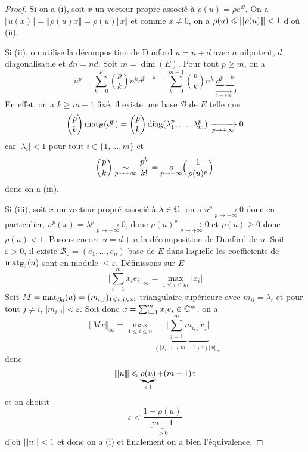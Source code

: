 \documentclass[12pt]{article}
\begin{document}
\begin{proof}
	Si on a (i), soit $x$ un vecteur propre associé à $\rho(u)=\rho e^{\mathrm{i}\theta}$. On a $\Vert u(x)\Vert=\Vert\rho(u) x\Vert=\rho(u)\Vert x\Vert$ et comme $x\neq0$, on a $\rho(u)\leqslant{\left\vert\kern-0.25ex\left\vert\kern-0.25ex\left\vert{}\rho(u) \right\vert\kern-0.25ex\right\vert\kern-0.25ex\right\vert}<1$ d'où (ii).

	Si (ii), on utilise la décomposition de Dunford $u=n+d$ avec $n$ nilpotent, $d$ diagonalisable et $dn=nd$. Soit $m=\dim(E)$. Pour tout $p\geqslant m$, on a 
	\begin{equation}u^{p}=\sum_{k=0}^{p}\binom{p}{k}n^{k}d^{p-k}=\sum_{k=0}^{m-1}\binom{p}{k}n^{k}\underbrace{d^{p-k}}_{\xrightarrow[p\to+\infty]{}0}\end{equation}
	En effet, on a $k\geqslant m-1$ fixé, il existe une base $\mathcal{B}$ de $E$ telle que 
	\begin{equation}\binom{p}{k}\operatorname{mat}\limits_{\mathcal{B}}(d^{p})=\binom{p}{k}\operatorname{diag}(\lambda_{1}^{p},\dots,\lambda_{m}^{p})\xrightarrow[p\to+\infty]{}0\end{equation}
	car $\vert\lambda_{i}\vert<1$ pour tout $i\in\{1,\dots,m\}$ et 
	\begin{equation}\binom{p}{k}\underset{p\to+\infty}{\sim}\frac{p^{k}}{k!}=\underset{p\to+\infty}{o}\Bigl(\frac{1}{\rho(u)^{p}}\Bigr)\end{equation}
	donc on a (iii).

	Si (iii), soit $x$ un vecteur propré associé à $\lambda\in\mathbb{C}$, on a $u^{p}\xrightarrow[p\to+\infty]{}0$ donc en particulier, $u^{p}(x)=\lambda^{p}\xrightarrow[p\to+\infty]{}0$, donc $\rho(u)^{p}\xrightarrow[p\to+\infty]{}0$ et $\rho(u)\geqslant0$ donc $\rho(u)<1$. Posons encore $u=d+n$ la décomposition de Dunford de $u$. Soit $\varepsilon>0$, il existe $\mathcal{B}_{0}=(e_{1},\dots,e_{n})$ base de $E$ dans laquelle les coefficients de $\operatorname{mat}\limits_{\mathcal{B}_{0}}(n)$ sont en module $\leqslant\varepsilon$. Définissons sur $E$ 
	\begin{equation}\Biggl\Vert\sum_{i=1}^{m}x_{i}e_{i}\Biggr\Vert_{\infty}=\max\limits_{1\leqslant i\leqslant m}\vert x_{i}\vert\end{equation}
	Soit $M=\operatorname{mat}\limits_{\mathcal{B}_{0}}(u)=(m_{i,j})_{1\leqslant i,j\leqslant m}$ triangulaire supérieure avec $m_{ii}=\lambda_{i}$ et pour tout $j\neq i$, $\vert m_{i,j}\vert<\varepsilon$. Soit donc $x=\sum_{i=1}^{m}x_{i}e_{i}\in\mathbb{C}^{m}$, on a 
	\begin{equation}
	\Vert Mx\Vert_{\infty}=\max\limits_{1\leqslant i\leqslant n}\underbrace{\Biggl\vert\sum_{j=1}^{m}m_{i,j}x_{j}\Biggr\vert}_{(\vert\lambda_{i}\vert+(m-1)\varepsilon)\Vert x\Vert_{\infty}}
	\end{equation}
	donc 
	\begin{equation}{\left\vert\kern-0.25ex\left\vert\kern-0.25ex\left\vert{}u \right\vert\kern-0.25ex\right\vert\kern-0.25ex\right\vert}\leqslant\underbrace{\rho(u)}_{<1}+(m-1)\varepsilon\end{equation}
	et on choisit
	\begin{equation}\varepsilon<\frac{1-\rho(u)}{\underbrace{m-1}_{>0}}\end{equation}
	d'où ${\left\vert\kern-0.25ex\left\vert\kern-0.25ex\left\vert{}u \right\vert\kern-0.25ex\right\vert\kern-0.25ex\right\vert}<1$ et donc on a (i) et finalement on a bien l'équivalence.
\end{proof}
\end{document}
